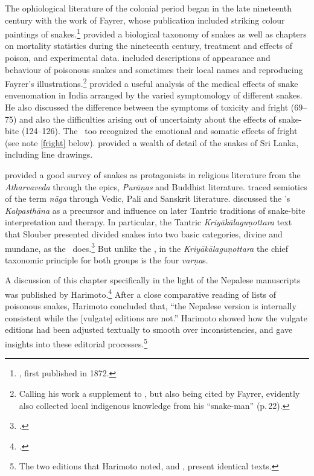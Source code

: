 The ophiological literature of the colonial period began in the late
nineteenth century with the work of Fayrer, whose publication included
striking colour paintings of snakes.\footnote{\cite{fayr-1874}, first
    published in 1872.} \citeauthor{fayr-1874} provided a biological taxonomy
    of snakes as well as chapters on mortality statistics during the
    nineteenth century, treatment and effects of poison, and experimental
    data. \citet{ewar-1878} included descriptions of appearance and behaviour
    of poisonous snakes and sometimes their local names and reproducing
    Fayrer's illustrations.\footnote{Calling his work a supplement to
        \citet{fayr-1874}, but also being cited by Fayrer, \cite{ewar-1878}
        evidently also collected local indigenous knowledge from his “snake-man”
        (p.\,22).} \citet[75--124]{wall-1913} provided a useful analysis of the
        medical effects of snake envenomation in India arranged by the varied
        symptomology of different snakes.  He also discussed the difference
        between the symptoms of toxicity and fright (69--75) and also the
        difficulties arising out of uncertainty about the effects of snake-bite
        (124--126).  The \SS\ too recognized the emotional and somatic effects of
        fright (see note \ref{fright} below). \citet{wall-1921} provided a wealth
        of detail of the snakes of Sri Lanka, including line drawings.
        
\citet{doni-2015} provided a good survey of snakes as protagonists in
religious literature from the \emph{Atharvaveda} through the epics,
\emph{Purāṇas} and Buddhist literature. \citet{seme-1979} traced
semiotics of the term \emph{nāga} through Vedic, Pali and Sanskrit
literature.  \citet[31--33 \emph{et passim}]{slou-2016} discussed the
\SS's \emph{Kalpasthāna} as a precursor and influence on later Tantric
traditions of snake-bite interpretation and therapy.  In particular, the
Tantric \emph{Kriyākālaguṇottara} text that Slouber presented
divided snakes into two basic categories, divine and mundane, as the \SS\
does.\footcite[144--145]{slou-2016}  But unlike the \SS, in the
\emph{Kriyākālaguṇottara} the chief taxonomic principle for both groups
is the four \emph{varṇa}s.  
    
A discussion of this chapter specifically in the light of the Nepalese
manuscripts was published by Harimoto.\footcite[101--104]{hari-2011} After a
close comparative reading of lists of poisonous snakes, Harimoto concluded
that, “the Nepalese version is internally consistent while the [vulgate]
editions are not.”  Harimoto showed how the vulgate editions had been
adjusted textually to smooth over inconsistencies, and gave insights into
these editorial processes.\footnote{The two editions that Harimoto noted,
    \cite{vulgate} and \cite{bhat-1889}, present identical texts.}

